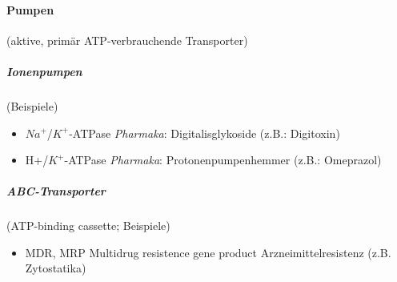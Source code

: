 \documentclass[10pt,a4paper]{report}
\begin{document}
\paragraph{Pumpen} (aktive, primär ATP-verbrauchende Transporter)\\
\subparagraph{Ionenpumpen} (Beispiele)
\begin{itemize}
	\item $Na^+$/$K^+$-ATPase 	\textit{Pharmaka}: Digitalisglykoside (z.B.: Digitoxin)
	\item H+/$K^+$-ATPase		\textit{Pharmaka}: Protonenpumpenhemmer (z.B.: Omeprazol)
\end{itemize}
\subparagraph{ABC-Transporter} (ATP-binding cassette; Beispiele)
\begin{itemize}
	\item MDR, MRP		Multidrug resistence gene product Arzneimittelresistenz (z.B. Zytostatika)	
\end{itemize}
\end{document}
